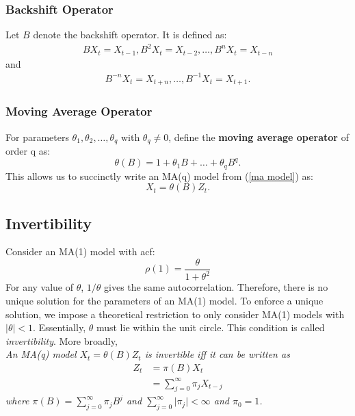 \documentclass{article}
\begin{document}
\subsubsection{Backshift Operator}
Let $B$ denote the backshift operator. It is defined as:
\begin{align}
    BX_t=X_{t-1}, B^2X_t=X_{t-2}, \ldots, B^nX_t=X_{t-n}\nonumber
\end{align}
and
\begin{align}
    B^{-n}X_t=X_{t+n}, \ldots, B^{-1}X_t=X_{t+1}.\nonumber
\end{align}
\subsubsection{Moving Average Operator}
For parameters $\theta_1, \theta_{2}, \ldots, \theta_{q}$ with $\theta_q \neq 0$, define the \textbf{moving average operator} of order q as:
\begin{equation}\label{moving average operator}
    \theta(B) = 1 + \theta_1 B + \ldots + \theta_q B^q.
\end{equation}
This allows us to succinctly write an MA(q) model from (\ref{ma model}) as:
\begin{equation}
    X_t = \theta(B)Z_t.
\end{equation}
\subsection{Invertibility}
Consider an MA(1) model with acf:
\begin{equation}
    \rho(1)=\frac{\theta}{1 + \theta^2}\nonumber
\end{equation}
For any value of $\theta$, $1/\theta$ gives the same autocorrelation. Therefore, there is no unique solution for the parameters of an MA(1) model. To enforce a unique solution, we impose a theoretical restriction to only consider MA(1) models with $\lvert \theta \rvert < 1$. Essentially, $\theta$ must lie within the unit circle. This condition is called \emph{invertibility}. More broadly, \\
\textit{An MA(q) model $X_t=\theta(B)Z_t$ is invertible iff it can be written as
\begin{align}\label{invertible}
    Z_t&=\pi(B)X_t\nonumber\\
    &= \sum_{j=0}^{\infty} \pi_j X_{t-j}
\end{align}
where $\pi(B)=\sum_{j=0}^{\infty} \pi_j B^j$ and $\sum_{j=0}^{\infty} \lvert \pi_j \rvert < \infty$ and $\pi_0=1$.}
\end{document}
